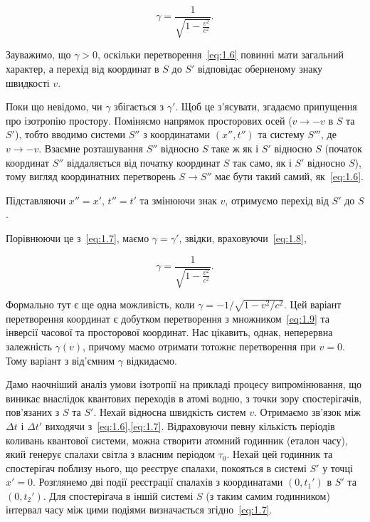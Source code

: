 \begin{equation}
\gamma = \frac{1}{\sqrt{1 - \frac{v^2}{c^2}}}.
\label{eq:1.8}
\end{equation}

Зауважимо, що $\gamma > 0$, оскільки перетворення~\eqref{eq:1.6} повинні мати загальний характер, а перехід від координат в $S$ до $S'$ відповідає оберненому знаку швидкості $v$.

Поки що невідомо, чи $\gamma$ збігається з $\gamma'$. Щоб це з’ясувати, згадаємо припущення про ізотропію простору. Поміняємо напрямок просторових осей ($v \to -v$ в $S$ та $S'$), тобто вводимо системи $S''$ з координатами $(x'', t'')$ та систему $S'''$, де $v \to -v$. Взаємне розташування $S''$ відносно $S$ таке ж як і $S'$ відносно $S$ (початок координат $S''$ віддаляється від початку координат $S$ так само, як і $S'$ відносно $S$), тому вигляд координатних перетворень $S \to S''$ має бути такий самий, як~\eqref{eq:1.6}.

Підставляючи $x'' = x'$, $t'' = t'$ та змінюючи знак $v$, отримуємо перехід від $S'$ до $S$.

Порівнюючи це з~\eqref{eq:1.7}, маємо $\gamma = \gamma'$, звідки, враховуючи~\eqref{eq:1.8},

\begin{equation}
\gamma = \frac{1}{\sqrt{1 - \frac{v^2}{c^2}}}.
\label{eq:1.9}
\end{equation}

Формально тут є ще одна можливість, коли $\gamma = -1/\sqrt{1 - v^2/c^2}$. Цей варіант перетворення координат є добутком перетворення з множником~\eqref{eq:1.9} та інверсії часової та просторової координат. Нас цікавить, однак, неперервна залежність $\gamma(v)$, причому маємо отримати тотожнє перетворення при $v=0$. Тому варіант з від'ємним $\gamma$ відкидаємо.

Дамо наочніший аналіз умови ізотропії на прикладі процесу випромінювання, що виникає внаслідок квантових переходів в атомі водню, з точки зору спостерігачів, пов'язаних з $S$ та $S'$. Нехай відносна швидкість систем $v$. Отримаємо зв'язок між $\Delta t$ і $\Delta t'$ виходячи з~\eqref{eq:1.6},\eqref{eq:1.7}. Відраховуючи певну кількість періодів коливань квантової системи, можна створити атомний годинник (еталон часу), який генерує спалахи світла з власним періодом $\tau_0$. Нехай цей годинник та спостерігач поблизу нього, що реєструє спалахи, покояться в системі $S'$ у точці $x'=0$. Розглянемо дві події реєстрації спалахів з координатами $(0, t_1')$ в $S'$ та $(0, t_2')$. Для спостерігача в іншій системі $S$ (з таким самим годинником) інтервал часу між цими подіями визначається згідно~\eqref{eq:1.7}.

